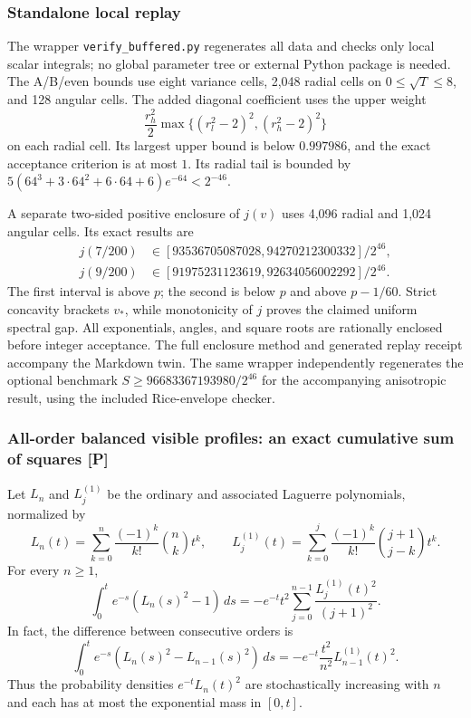 \subsubsection{Standalone local replay}
The wrapper \texttt{verify\_buffered.py} regenerates all data and checks
only local scalar integrals; no global parameter tree or external Python
package is needed. The A/B/even bounds use eight variance cells, 2,048
radial cells on $0\le\sqrt T\le8$, and 128 angular cells. The added
diagonal coefficient uses the upper weight
\[
 \frac{r_h^2}{2}\max\{(r_l^2-2)^2,(r_h^2-2)^2\}
\]
on each radial cell. Its largest upper bound is below $0.997986$,
and the exact acceptance criterion is at most $1$.
Its radial tail is bounded by
$5(64^3+3\cdot64^2+6\cdot64+6)e^{-64}<2^{-46}$.

A separate two-sided positive enclosure of $j(v)$ uses 4,096 radial
and 1,024 angular cells. Its exact results are
\begin{align*}
 j(7/200)&\in[93536705087028,94270212300332]/2^{46},\\
 j(9/200)&\in[91975231123619,92634056002292]/2^{46}.
\end{align*}
The first interval is above $p$; the second is below $p$ and above
$p-1/60$. Strict concavity brackets $v_*$, while monotonicity of $j$
proves the claimed uniform spectral gap. All exponentials, angles,
and square roots are rationally enclosed before integer acceptance.
The full enclosure method and generated replay receipt accompany the
Markdown twin. The same wrapper independently regenerates the optional
benchmark $S\ge96683367193980/2^{46}$ for the accompanying anisotropic
result, using the included Rice-envelope checker.

\subsubsection{All-order balanced visible profiles: an exact cumulative sum of squares [P]}
\label{sec:laguerre-profile-sos}
Let $L_n$ and $L_j^{(1)}$ be the ordinary and associated Laguerre polynomials,
normalized by
\[
L_n(t)=\sum_{k=0}^n\frac{(-1)^k}{k!}\binom nk t^k,
\qquad L_j^{(1)}(t)=\sum_{k=0}^j\frac{(-1)^k}{k!}\binom{j+1}{j-k}t^k.
\]
For every $n\ge1$,
\begin{equation}
\boxed{\int_0^t e^{-s}(L_n(s)^2-1)\,ds
=-e^{-t}t^2\sum_{j=0}^{n-1}\frac{L_j^{(1)}(t)^2}{(j+1)^2}.}
\label{eq:laguerre-profile-sos}
\end{equation}
In fact, the difference between consecutive orders is
\[
\int_0^t e^{-s}(L_n(s)^2-L_{n-1}(s)^2)\,ds
=-e^{-t}\frac{t^2}{n^2}L_{n-1}^{(1)}(t)^2.
\]
Thus the probability densities $e^{-t}L_n(t)^2$ are stochastically
increasing with $n$ and each has at most the exponential mass in $[0,t]$.

